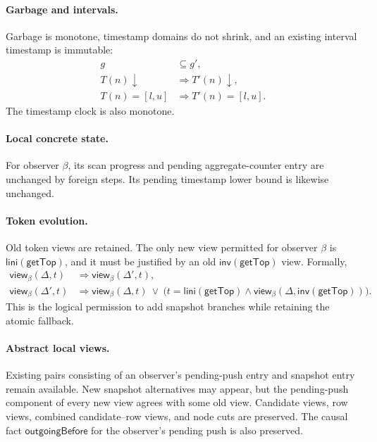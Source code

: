 \documentclass[11pt]{article}
\theoremstyle{definition}
\theoremstyle{remark}
\newcommand{\interval}[2]{[#1,#2]}
\newcommand{\Inv}{\mathsf{inv}}
\newcommand{\Lini}{\mathsf{lini}}
\newcommand{\GetTop}{\mathsf{getTop}}
\begin{document}
\paragraph{Garbage and intervals.}
Garbage is monotone, timestamp domains do not shrink, and an existing interval
timestamp is immutable:
\begin{align*}
g&\subseteq g',\\
T(n)\downarrow&\Longrightarrow T'(n)\downarrow,\\
T(n)=\interval{l}{u}&\Longrightarrow T'(n)=\interval{l}{u}.
\end{align*}
The timestamp clock is also monotone.

\paragraph{Local concrete state.}
For observer \(\beta\), its scan progress and pending aggregate-counter entry
are unchanged by foreign steps.  Its pending timestamp lower bound is likewise
unchanged.

\paragraph{Token evolution.}
Old token views are retained.  The only new view permitted for observer
\(\beta\) is \(\Lini(\GetTop)\), and it must be justified by an old
\(\Inv(\GetTop)\) view.  Formally,
\begin{align*}
\mathsf{view}_\beta(\Delta,t)&\Rightarrow
  \mathsf{view}_\beta(\Delta',t),\\
\mathsf{view}_\beta(\Delta',t)&\Rightarrow
  \mathsf{view}_\beta(\Delta,t)\ \lor\
  \bigl(t=\Lini(\GetTop)\land
        \mathsf{view}_\beta(\Delta,\Inv(\GetTop))\bigr).
\end{align*}
This is the logical permission to add snapshot branches while retaining the
atomic fallback.

\paragraph{Abstract local views.}
Existing pairs consisting of an observer's pending-push entry and snapshot
entry remain available.  New snapshot alternatives may appear, but the
pending-push component of every new view agrees with some old view.  Candidate
views, row views, combined candidate--row views, and node cuts are preserved.
The causal fact \(\mathsf{outgoingBefore}\) for the observer's pending push is
also preserved.
\end{document}

